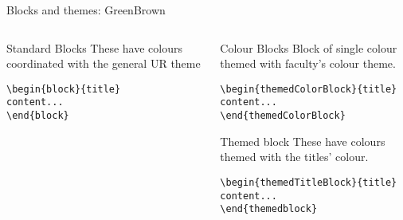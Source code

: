 \begingroup
{}
\begin{frame}[fragile]{Blocks and themes: GreenBrown}
\begin{columns} %
\begin{column}{0.3\textwidth}
\begin{block}{Standard Blocks}
These have colours coordinated with the general UR theme
\begin{verbatim}
\begin{block}{title}
content...
\end{block}
\end{verbatim}
\end{block}
\end{column}
\begin{column}{0.7\textwidth}
\begin{themedColorBlock}{Colour Blocks}
Block of single colour themed with faculty's colour theme.
\small
\begin{verbatim}
\begin{themedColorBlock}{title}
content...
\end{themedColorBlock}
\end{verbatim}
\end{themedColorBlock}
\begin{themedTitleBlock} {Themed block}
These have colours themed with the titles' colour.
\small
\begin{verbatim}
\begin{themedTitleBlock}{title}
content...
\end{themedblock}
\end{verbatim}
\end{themedTitleBlock}
\end{column}
\end{columns}
\end{frame}
\endgroup


